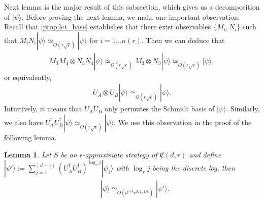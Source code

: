 \documentclass[11pt,letterpaper]{article}
\newcommand{\ket}[1]{|#1\rangle}
\newcommand{\x}{\otimes}
\newcommand{\ct}{^{\dagger}}
\newcommand{\1}{\mathbb{1}}
\newcommand{\nr}{n(r)}
\newcommand{\fC}{\mathfrak{C}}
\newcommand{\ep}{\epsilon}
\newcommand{\se}{\sqrt{\epsilon}}
\newcommand{\appd}[1]{\simeq_{#1}}
\newtheorem{lemma}[theorem]{Lemma}
\theoremstyle{definition}
\begin{document}
Next lemma is the major result of this subsection, which gives us a decomposition of $\ket{\psi}$.
Before proving the next lemma, we make one important observation.
Recall that \cref{prop:lct_base} establishes that there exist observables $\{M_i, N_i\}$ such that 
$M_iN_i \ket{\psi} \appd{O(r\se)} \ket{\psi}$ for $i = 1 \dots \nr$.
Then we can deduce that 
\begin{align*}
	M_3M_4 \x N_3N_4 \ket{\psi} \appd{O(r\se)} M_3 \x N_3 \ket{\psi} \appd{O(r\se)} \ket{\psi},
\end{align*}
or equivalently,
\begin{align*}
	U_A \x U_B \ket{\psi} \appd{O(r\se)} \ket{\psi}.
\end{align*}
Intuitively, it means that $U_A U_B $ only permutes the Schmidt basis of $\ket{\psi}$.
Similarly, we also have $U_A\ct U_B\ct \ket{\psi} \appd{O(r\se)} \ket{\psi}$.
We use this observation in the proof of the following lemma.
\begin{lemma}
\label{lm:decomp_psi}
Let $S$ be an $\ep$-approximate strategy of $\fC(d,r)$ and 
define 
$\ket{\psi'} := \sum_{j=1}^{(d-1)} (U_A\ct U_B\ct)^{\log_r j} \ket{\psi_1}$
with $\log_r j$ being the discrete log,
then
\begin{align}
	&\ket{\psi} \appd{O(d^{5/4} r^{d/2} \ep^{1/8})} \ket{\psi'}.
\end{align}
\end{lemma}
\end{document}
